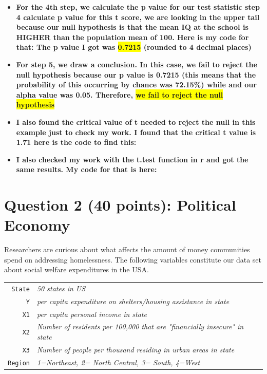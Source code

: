 \documentclass[12pt,letterpaper]{article}
\begin{document}
\begin{enumerate}
\begin{itemize}
		\item \textbf{For the 4th step, we calculate the p value for our test statistic step 4 calculate p value for this t score, we are looking in the upper tail because our null hypothesis is that the mean IQ at the school is HIGHER than the population mean of 100. Here is my code for that: The p value I got was \colorbox{yellow}{0.7215} (rounded to 4 decimal places)}
		
		
		
		\item \textbf{For step 5, we draw a conclusion. In this case, we fail to reject the null hypothesis because our p value is 0.7215 (this means that the probability of this occurring by chance was 72.15\%) while and our alpha value was 0.05. Therefore, \colorbox{yellow}{we fail to reject the null hypothesis}}
			
		\item \textbf{I also found the critical value of t needed to reject the null in this example just to check my work. I found that the critical t value is 1.71 here is the code to find this:}
		
		
		\item \textbf{I also checked my work with the t.test function in r and got the same results. My code for that is here:}
		
			
			
		
	\end{itemize}
\end{enumerate}

\newpage

	\section*{Question 2 (40 points): Political Economy}

\noindent Researchers are curious about what affects the amount of money communities spend on addressing homelessness. The following variables constitute our data set about social welfare expenditures in the USA. \\
\vspace{.5cm}


\begin{tabular}{r|l}
	\texttt{State} &\emph{50 states in US} \\
	\texttt{Y} & \emph{per capita expenditure on shelters/housing assistance in state}\\
	\texttt{X1} &\emph{per capita personal income in state} \\
	\texttt{X2} &  \emph{Number of residents per 100,000 that are "financially insecure" in state}\\
	\texttt{X3} &  \emph{Number of people per thousand residing in urban areas in state} \\
	\texttt{Region} &  \emph{1=Northeast, 2= North Central, 3= South, 4=West} \\
\end{tabular}
\end{document}
